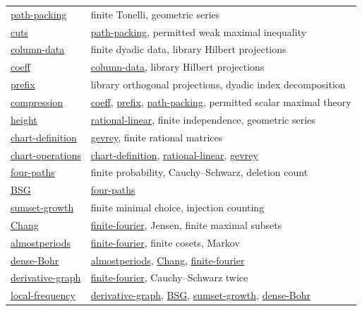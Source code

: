 \documentclass[11pt]{article}
\theoremstyle{definition}
\numberwithin{equation}{section}
\begin{document}
\begin{longtable}{@{}p{}p{}@{}}
\hyperlink{bp:path-packing}{path-packing} & finite Tonelli, geometric series\\[3pt]
\hyperlink{bp:cuts}{cuts} & \hyperlink{bp:path-packing}{path-packing}, permitted weak maximal inequality\\[3pt]
\hyperlink{bp:column-data}{column-data} & finite dyadic data, library Hilbert projections\\[3pt]
\hyperlink{bp:coeff}{coeff} & \hyperlink{bp:column-data}{column-data}, library Hilbert projections\\[3pt]
\hyperlink{bp:prefix}{prefix} & library orthogonal projections, dyadic index decomposition\\[3pt]
\hyperlink{bp:compression}{compression} & \hyperlink{bp:coeff}{coeff}, \hyperlink{bp:prefix}{prefix}, \hyperlink{bp:path-packing}{path-packing}, permitted scalar maximal theory\\[3pt]
\hyperlink{bp:height}{height} & \hyperlink{bp:rational-linear}{rational-linear}, finite independence, geometric series\\[3pt]
\hyperlink{bp:chart-definition}{chart-definition} & \hyperlink{bp:gevrey}{gevrey}, finite rational matrices\\[3pt]
\hyperlink{bp:chart-operations}{chart-operations} & \hyperlink{bp:chart-definition}{chart-definition}, \hyperlink{bp:rational-linear}{rational-linear}, \hyperlink{bp:gevrey}{gevrey}\\[3pt]
\hyperlink{bp:four-paths}{four-paths} & finite probability, Cauchy--Schwarz, deletion count\\[3pt]
\hyperlink{bp:BSG}{BSG} & \hyperlink{bp:four-paths}{four-paths}\\[3pt]
\hyperlink{bp:sumset-growth}{sumset-growth} & finite minimal choice, injection counting\\[3pt]
\hyperlink{bp:Chang}{Chang} & \hyperlink{bp:finite-fourier}{finite-fourier}, Jensen, finite maximal subsets\\[3pt]
\hyperlink{bp:almostperiods}{almostperiods} & \hyperlink{bp:finite-fourier}{finite-fourier}, finite cosets, Markov\\[3pt]
\hyperlink{bp:dense-Bohr}{dense-Bohr} & \hyperlink{bp:almostperiods}{almostperiods}, \hyperlink{bp:Chang}{Chang}, \hyperlink{bp:finite-fourier}{finite-fourier}\\[3pt]
\hyperlink{bp:derivative-graph}{derivative-graph} & \hyperlink{bp:finite-fourier}{finite-fourier}, Cauchy--Schwarz twice\\[3pt]
\hyperlink{bp:local-frequency}{local-frequency} & \hyperlink{bp:derivative-graph}{derivative-graph}, \hyperlink{bp:BSG}{BSG}, \hyperlink{bp:sumset-growth}{sumset-growth}, \hyperlink{bp:dense-Bohr}{dense-Bohr}\\[3pt]

\end{longtable}
\end{document}

